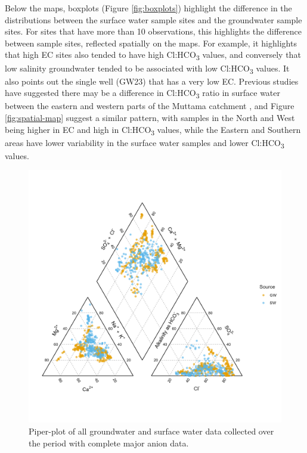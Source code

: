 \documentclass[, manuscript]{copernicus}
\begin{document}
Below the maps, boxplots (Figure \ref{fig:boxplots}) highlight the
difference in the distributions between the surface water sample sites
and the groundwater sample sites. For sites that have more than 10
observations, this highlights the difference between sample sites,
reflected spatially on the maps. For example, it highlights that high EC
sites also tended to have high Cl:HCO\textsubscript{3} values, and
conversely that low salinity groundwater tended to be associated with
low Cl:HCO\textsubscript{3} values. It also points out the single well
(GW23) that has a very low EC. Previous studies have suggested there may
be a difference in Cl:HCO\textsubscript{3} ratio in surface water
between the eastern and western parts of the Muttama catchment
\citep{Conyers2008}, and Figure \ref{fig:spatial-map} suggest a similar
pattern, with samples in the North and West being higher in EC and high
in Cl:HCO\textsubscript{3} values, while the Eastern and Southern areas
have lower variability in the surface water samples and lower
Cl:HCO\textsubscript{3} values.

\begin{figure}
\includegraphics[width=1\linewidth]{Figures/piper_plot} \caption{Piper-plot of all groundwater and surface water data collected over the period with complete major anion data.}\label{fig:piperplot}
\end{figure}
\end{document}
